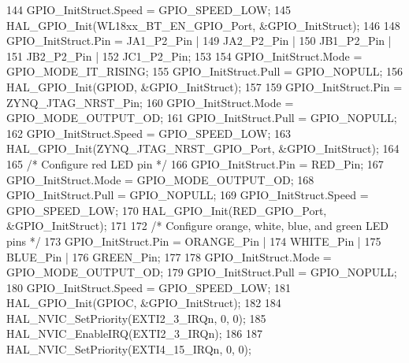 \begin{DoxyCode}
144     GPIO\_InitStruct.Speed = GPIO\_SPEED\_LOW;
145     HAL\_GPIO\_Init(WL18xx\_BT\_EN\_GPIO\_Port, &GPIO\_InitStruct);
146 
148     GPIO\_InitStruct.Pin = JA1\_P2\_Pin |
149                   JA2\_P2\_Pin |
150                   JB1\_P2\_Pin |
151                   JB2\_P2\_Pin |
152                   JC1\_P2\_Pin;
153                 
154     GPIO\_InitStruct.Mode = GPIO\_MODE\_IT\_RISING;
155     GPIO\_InitStruct.Pull = GPIO\_NOPULL;
156     HAL\_GPIO\_Init(GPIOD, &GPIO\_InitStruct);
157 
159     GPIO\_InitStruct.Pin = ZYNQ\_JTAG\_NRST\_Pin;
160     GPIO\_InitStruct.Mode = GPIO\_MODE\_OUTPUT\_OD;
161     GPIO\_InitStruct.Pull = GPIO\_NOPULL;
162     GPIO\_InitStruct.Speed = GPIO\_SPEED\_LOW;
163     HAL\_GPIO\_Init(ZYNQ\_JTAG\_NRST\_GPIO\_Port, &GPIO\_InitStruct);
164     
165     \textcolor{comment}{/* Configure red LED pin */}
166     GPIO\_InitStruct.Pin = RED\_Pin;
167     GPIO\_InitStruct.Mode = GPIO\_MODE\_OUTPUT\_OD;
168     GPIO\_InitStruct.Pull = GPIO\_NOPULL;
169     GPIO\_InitStruct.Speed = GPIO\_SPEED\_LOW;
170     HAL\_GPIO\_Init(RED\_GPIO\_Port, &GPIO\_InitStruct);
171     
172     \textcolor{comment}{/* Configure orange, white, blue, and green LED pins */}
173     GPIO\_InitStruct.Pin = ORANGE\_Pin |
174                   WHITE\_Pin |
175                   BLUE\_Pin |
176                   GREEN\_Pin;
177         
178     GPIO\_InitStruct.Mode = GPIO\_MODE\_OUTPUT\_OD;
179     GPIO\_InitStruct.Pull = GPIO\_NOPULL;
180     GPIO\_InitStruct.Speed = GPIO\_SPEED\_LOW;
181     HAL\_GPIO\_Init(GPIOC, &GPIO\_InitStruct);
182 
184     HAL\_NVIC\_SetPriority(EXTI2\_3\_IRQn, 0, 0);
185     HAL\_NVIC\_EnableIRQ(EXTI2\_3\_IRQn);
186     
187     HAL\_NVIC\_SetPriority(EXTI4\_15\_IRQn, 0, 0);
\end{DoxyCode}
